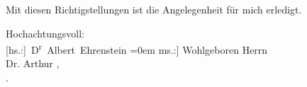 \pstart
           Mit diesen Richtigstellungen ist die Angelegenheit für mich erledigt.\pend
           
\pstart
           Hochachtungsvoll:{\\[\baselineskip]}\spacefill\mbox{{[}hs.:{]} D\textsuperscript{r} Albert Ehrenstein}\pend
           \leftskip=0em{}
\pstart
           \noindent{}{[}ms.:{]} Wohlgeboren Herrn{\\}Dr. Arthur ,{\\}.\pend
           \endnumbering{}  \newcommand{\dateiname}{L02017}\newcommand{\titel}{Albert Ehrenstein an Arthur Schnitzler, 27. 4. 1911}\newcommand{\editorInnen}{Martin Anton Müller und Gerd-Hermann Susen}

